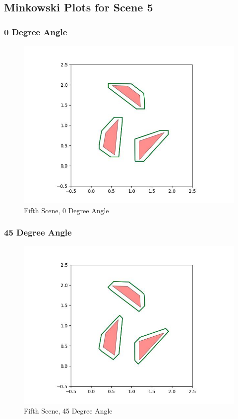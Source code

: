 \documentclass{article}
\begin{document}
\newpage
\subsection{Minkowski Plots for Scene 5}
\subsubsection{0 Degree Angle}
\begin{figure}[h!]
	\includegraphics[width= 0.9 \linewidth]{Problem3_minkowski5_0.jpg}
	\centering
	\caption{Fifth Scene, 0 Degree Angle}
	\label{Problem3_minkowski5_0.jpg}
\end{figure}

\newpage
\subsubsection{45 Degree Angle}
\begin{figure}[h!]
	\includegraphics[width= 0.9 \linewidth]{Problem3_minkowski5_45.jpg}
	\centering
	\caption{Fifth Scene, 45 Degree Angle}
	\label{Problem3_minkowski5_45.jpg}
\end{figure}
\end{document}

